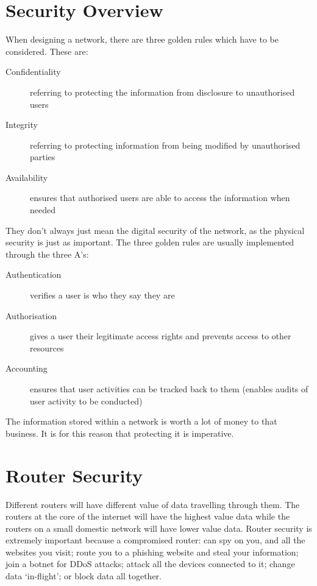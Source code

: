 
\section{Security Overview}
When designing a network, there are three golden rules which have to be considered. These are:
\begin{description}
    \item[Confidentiality] referring to protecting the information from disclosure to unauthorised users
    \item[Integrity] referring to protecting information from being modified by unauthorised parties
    \item[Availability] ensures that authorised users are able to access the information when needed
\end{description}

They don't always just mean the digital security of the network, as the physical security is just as important. The three golden rules are usually implemented through the three A's:
\begin{description}
    \item[Authentication] verifies a user is who they say they are
    \item[Authorisation] gives a user their legitimate access rights and prevents access to other resources
    \item[Accounting] ensures that user activities can be tracked back to them (enables audits of user activity to be conducted) 
\end{description}

The information stored within a network is worth a lot of money to that business. It is for this reason that protecting it is imperative.

\section{Router Security}
Different routers will have different value of data travelling through them. The routers at the core of the internet will have the highest value data while the routers on a small domestic network will have lower value data. Router security is extremely important because a compromised router: can spy on you, and all the websites you visit; route you to a phishing website and steal your information; join a botnet for DDoS attacks; attack all the devices connected to it; change data `in-flight'; or block data all together.\\

